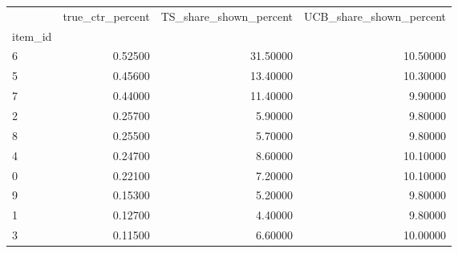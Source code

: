 \begin{tabular}{lrrr}
\toprule
 & true\_ctr\_percent & TS\_share\_shown\_percent & UCB\_share\_shown\_percent \\
item\_id &  &  &  \\
\midrule
6 & 0.52500 & 31.50000 & 10.50000 \\
5 & 0.45600 & 13.40000 & 10.30000 \\
7 & 0.44000 & 11.40000 & 9.90000 \\
2 & 0.25700 & 5.90000 & 9.80000 \\
8 & 0.25500 & 5.70000 & 9.80000 \\
4 & 0.24700 & 8.60000 & 10.10000 \\
0 & 0.22100 & 7.20000 & 10.10000 \\
9 & 0.15300 & 5.20000 & 9.80000 \\
1 & 0.12700 & 4.40000 & 9.80000 \\
3 & 0.11500 & 6.60000 & 10.00000 \\
\bottomrule
\end{tabular}
